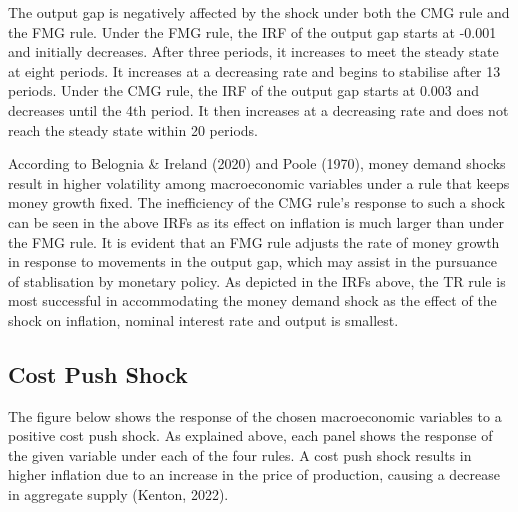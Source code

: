 \documentclass[11pt,preprint, authoryear]{elsarticle}
\numberwithin{equation}{section}
\numberwithin{figure}{section}
\numberwithin{table}{section}
\begin{document}
The output gap is negatively affected by the shock under both the CMG
rule and the FMG rule. Under the FMG rule, the IRF of the output gap
starts at -0.001 and initially decreases. After three periods, it
increases to meet the steady state at eight periods. It increases at a
decreasing rate and begins to stabilise after 13 periods. Under the CMG
rule, the IRF of the output gap starts at 0.003 and decreases until the
4th period. It then increases at a decreasing rate and does not reach
the steady state within 20 periods.

According to Belognia \& Ireland (2020) and Poole (1970), money demand
shocks result in higher volatility among macroeconomic variables under a
rule that keeps money growth fixed. The inefficiency of the CMG rule's
response to such a shock can be seen in the above IRFs as its effect on
inflation is much larger than under the FMG rule. It is evident that an
FMG rule adjusts the rate of money growth in response to movements in
the output gap, which may assist in the pursuance of stablisation by
monetary policy. As depicted in the IRFs above, the TR rule is most
successful in accommodating the money demand shock as the effect of the
shock on inflation, nominal interest rate and output is smallest.

\hypertarget{cost-push-shock}{%
\subsection{Cost Push Shock}\label{cost-push-shock}}

The figure below shows the response of the chosen macroeconomic
variables to a positive cost push shock. As explained above, each panel
shows the response of the given variable under each of the four rules. A
cost push shock results in higher inflation due to an increase in the
price of production, causing a decrease in aggregate supply (Kenton,
2022).
\end{document}
